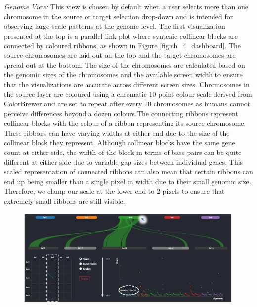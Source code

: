\textit{Genome View:}
This view is chosen by default when a user selects more than one chromosome in the source or target selection drop-down and is intended for observing large scale patterns at the genome level.
The first visualization presented at the top is a parallel link plot where syntenic collinear blocks are connected by coloured ribbons, as shown in Figure \ref{fig:ch_4_dashboard}. The source chromosomes are laid out on the top and the target chromosomes are spread out at the bottom. The size of the chromosomes are calculated based on the genomic sizes of the chromosomes and the available screen width to ensure that the visualizations are accurate across different screen sizes. Chromosomes in the source layer are coloured using a chromatic 10 point colour scale derived from ColorBrewer\cite{colorbrewer} and are set to repeat after every 10 chromosomes as humans cannot perceive differences beyond a dozen colours\cite{ware2012information}.The connecting ribbons represent collinear blocks with the colour of a ribbon representing its source chromosome. These ribbons can have varying widths at either end due to the size of the collinear block they represent. Although collinear blocks have the same gene count at either side, the width of the block in terms of base pairs can be quite different at either side due to variable gap sizes between individual genes. This scaled representation of connected ribbons can also mean that certain ribbons can end up being smaller than a single pixel in width due to their small genomic size. Therefore, we clamp our scale at the lower end to 2 pixels to ensure that extremely small ribbons are still visible.


\begin{figure}
  \centering
  \includegraphics[width=1\linewidth]{images/ch_5_genome_view_2.PNG}
  \label{fig:ch_5_genome_view_2}
\end{figure} 


